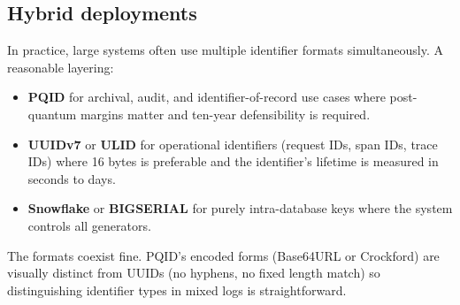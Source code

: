 \subsection{Hybrid deployments}

In practice, large systems often use multiple identifier formats simultaneously. A reasonable layering:

\begin{itemize}
  \item \textbf{PQID} for archival, audit, and identifier-of-record use cases where post-quantum margins matter and ten-year defensibility is required.
  \item \textbf{UUIDv7} or \textbf{ULID} for operational identifiers (request IDs, span IDs, trace IDs) where 16 bytes is preferable and the identifier's lifetime is measured in seconds to days.
  \item \textbf{Snowflake} or \textbf{BIGSERIAL} for purely intra-database keys where the system controls all generators.
\end{itemize}

The formats coexist fine. PQID's encoded forms (Base64URL or Crockford) are visually distinct from UUIDs (no hyphens, no fixed length match) so distinguishing identifier types in mixed logs is straightforward.

